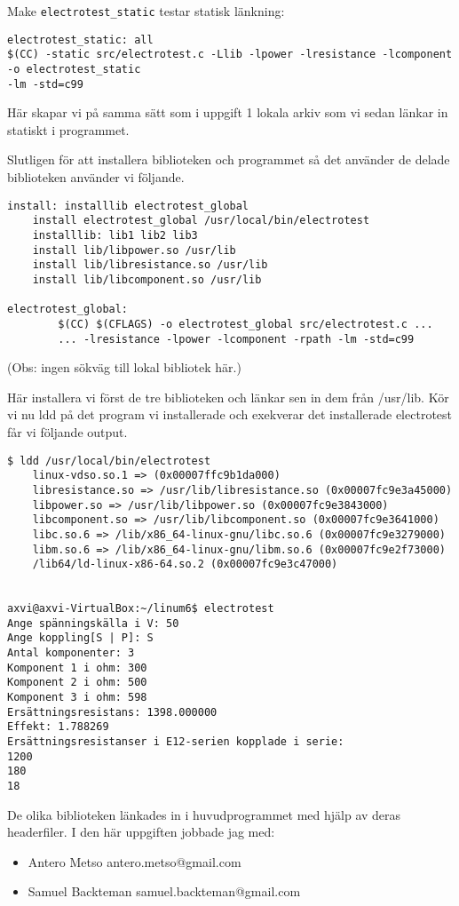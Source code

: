 \documentclass[10pt, a4paper]{article}
\begin{document}
Make \verb!electrotest_static! testar statisk länkning:

\begin{verbatim}
electrotest_static: all
$(CC) -static src/electrotest.c -Llib -lpower -lresistance -lcomponent -o electrotest_static
-lm -std=c99
\end{verbatim}
Här skapar vi på samma sätt som i uppgift 1 lokala arkiv som vi sedan länkar in statiskt i
programmet.

Slutligen för att installera biblioteken och programmet så det använder de delade biblioteken använder vi följande.
\begin{verbatim}
install: installlib electrotest_global
	install electrotest_global /usr/local/bin/electrotest
	installlib: lib1 lib2 lib3
	install lib/libpower.so /usr/lib
	install lib/libresistance.so /usr/lib
	install lib/libcomponent.so /usr/lib

electrotest_global:
		$(CC) $(CFLAGS) -o electrotest_global src/electrotest.c ...
		... -lresistance -lpower -lcomponent -rpath -lm -std=c99
\end{verbatim}
(Obs: ingen sökväg till lokal bibliotek här.)

Här installera vi först de tre biblioteken och länkar sen in dem från /usr/lib.
Kör vi nu ldd på det program vi installerade och exekverar det installerade electrotest får vi följande output.
\begin{verbatim}
$ ldd /usr/local/bin/electrotest
	linux-vdso.so.1 => (0x00007ffc9b1da000)
	libresistance.so => /usr/lib/libresistance.so (0x00007fc9e3a45000)
	libpower.so => /usr/lib/libpower.so (0x00007fc9e3843000)
	libcomponent.so => /usr/lib/libcomponent.so (0x00007fc9e3641000)
	libc.so.6 => /lib/x86_64-linux-gnu/libc.so.6 (0x00007fc9e3279000)
	libm.so.6 => /lib/x86_64-linux-gnu/libm.so.6 (0x00007fc9e2f73000)
	/lib64/ld-linux-x86-64.so.2 (0x00007fc9e3c47000)


axvi@axvi-VirtualBox:~/linum6$ electrotest 
Ange spänningskälla i V: 50
Ange koppling[S | P]: S
Antal komponenter: 3
Komponent 1 i ohm: 300
Komponent 2 i ohm: 500
Komponent 3 i ohm: 598
Ersättningsresistans: 1398.000000
Effekt: 1.788269
Ersättningsresistanser i E12-serien kopplade i serie:
1200
180
18
\end{verbatim}

De olika biblioteken länkades in i huvudprogrammet med hjälp av deras headerfiler. I den här uppgiften jobbade jag med:

\begin{itemize}
    \item Antero Metso antero.metso@gmail.com
    \item Samuel Backteman samuel.backteman@gmail.com
\end{itemize}
\end{document}
